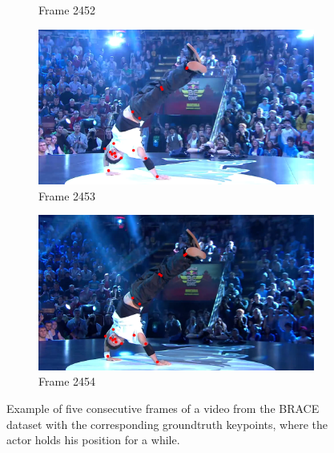 \documentclass[./main.tex]{subfiles}
\begin{document}
\begin{figure}[htbp]
\begin{subfigure}{0.45\textwidth}
        \caption{Frame 2452}
    \end{subfigure}
    \begin{subfigure}{0.45\textwidth}
        \centering
        \includegraphics[width=\textwidth]{entities/BRACE_2453.png}
        \caption{Frame 2453}
    \end{subfigure}
    \begin{subfigure}{0.45\textwidth}
        \centering
        \includegraphics[width=\textwidth]{entities/BRACE_2454.png}
        \caption{Frame 2454}
    \end{subfigure}

    \caption{Example of five consecutive frames of a video from the BRACE dataset with the corresponding groundtruth keypoints,
    where the actor holds his position for a while.}
    \label{fig:BRACE_dataset_static}
\end{figure}
\end{document}
